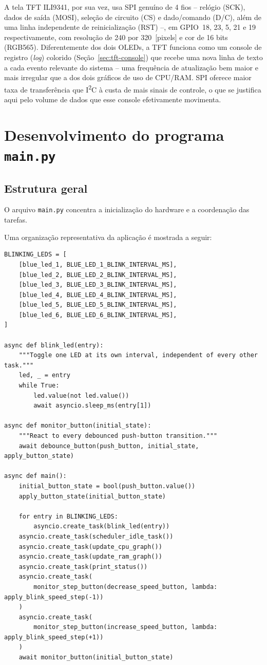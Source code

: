 \documentclass[12pt,a4paper]{article}
\begin{document}
A tela TFT ILI9341, por sua vez, usa SPI genuíno de 4 fios -- relógio (SCK), dados de saída (MOSI), seleção de circuito (CS) e dado/comando (D/C), além de uma linha independente de reinicialização (RST) --, em GPIO~18, 23, 5, 21 e 19 respectivamente, com resolução de 240 por 320~[pixels] e cor de 16 bits (RGB565). Diferentemente dos dois OLEDs, a TFT funciona como um console de registro (\textit{log}) colorido (Seção~\ref{sec:tft-console}) que recebe uma nova linha de texto a cada evento relevante do sistema -- uma frequência de atualização bem maior e mais irregular que a dos dois gráficos de uso de CPU/RAM. SPI oferece maior taxa de transferência que I\textsuperscript{2}C à custa de mais sinais de controle, o que se justifica aqui pelo volume de dados que esse console efetivamente movimenta.

\section{Desenvolvimento do programa \texttt{main.py}}

\subsection{Estrutura geral}
\label{sec:estrutura-geral}

O arquivo \texttt{main.py} concentra a inicialização do hardware e a coordenação das tarefas.

Uma organização representativa da aplicação é mostrada a seguir:

\begin{lstlisting}[caption={Estrutura lógica resumida do programa.},label={lst:estrutura}]
BLINKING_LEDS = [
    [blue_led_1, BLUE_LED_1_BLINK_INTERVAL_MS],
    [blue_led_2, BLUE_LED_2_BLINK_INTERVAL_MS],
    [blue_led_3, BLUE_LED_3_BLINK_INTERVAL_MS],
    [blue_led_4, BLUE_LED_4_BLINK_INTERVAL_MS],
    [blue_led_5, BLUE_LED_5_BLINK_INTERVAL_MS],
    [blue_led_6, BLUE_LED_6_BLINK_INTERVAL_MS],
]

async def blink_led(entry):
    """Toggle one LED at its own interval, independent of every other task."""
    led, _ = entry
    while True:
        led.value(not led.value())
        await asyncio.sleep_ms(entry[1])

async def monitor_button(initial_state):
    """React to every debounced push-button transition."""
    await debounce_button(push_button, initial_state, apply_button_state)

async def main():
    initial_button_state = bool(push_button.value())
    apply_button_state(initial_button_state)

    for entry in BLINKING_LEDS:
        asyncio.create_task(blink_led(entry))
    asyncio.create_task(scheduler_idle_task())
    asyncio.create_task(update_cpu_graph())
    asyncio.create_task(update_ram_graph())
    asyncio.create_task(print_status())
    asyncio.create_task(
        monitor_step_button(decrease_speed_button, lambda: apply_blink_speed_step(-1))
    )
    asyncio.create_task(
        monitor_step_button(increase_speed_button, lambda: apply_blink_speed_step(+1))
    )
    await monitor_button(initial_button_state)
\end{lstlisting}
\end{document}
